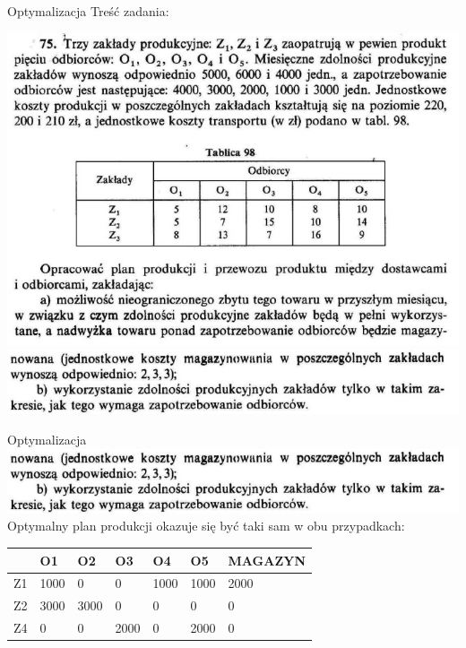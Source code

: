 \documentclass{beamer}
\begin{document}
  \begin{frame}{Optymalizacja}
    Treść zadania:

    \centering \includegraphics[scale=0.5]{images/obrazek1.png}
    \centering \includegraphics[scale=0.5]{images/obrazek2.png}
  \end{frame}
  \begin{frame}{Optymalizacja}
    \includegraphics[scale=0.5]{images/obrazek2.png}
    Optymalny plan produkcji okazuje się być taki sam w obu przypadkach: 
    \begin{table}[]
      \begin{tabular}{|l|l|l|l|l|l|l|}
      \hline
         & O1   & O2   & O3   & O4   & O5   & MAGAZYN \\ \hline
      Z1 & 1000 & 0    & 0    & 1000 & 1000 & 2000    \\ \hline
      Z2 & 3000 & 3000 & 0    & 0    & 0    & 0       \\ \hline
      Z4 & 0    & 0    & 2000 & 0    & 2000 & 0       \\ \hline
      \end{tabular}
      \end{table}

  \end{frame}
 
\end{document}
